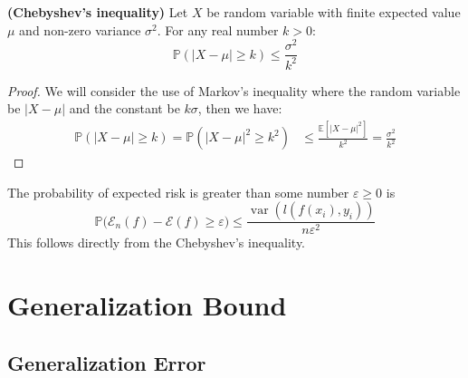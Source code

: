 \begin{theorem}{\textbf{(Chebyshev's inequality)}}
    Let $X$ be random variable with finite expected value $\mu$ and non-zero variance $\sigma^2$. For any real number $k>0$:
    \begin{equation*}
        \mathbb{P}(|X - \mu|\ge k) \le \frac{\sigma^2}{k^2} 
    \end{equation*}
\end{theorem}
\begin{proof}
    We will consider the use of Markov's inequality where the random variable be $|X-\mu|$ and the constant be $k\sigma$, then we have:
    \begin{equation*}
    \begin{aligned}
        \mathbb{P}(|X-\mu|\ge k) = \mathbb{P}(|X-\mu|^2\ge k^2) &\le \frac{\mathbb{E}[|X-\mu|^2]}{k^2} = \frac{\sigma^2}{k^2} 
    \end{aligned}
    \end{equation*}
\end{proof}

\begin{proposition}
    The probability of expected risk is greater than some number $\varepsilon\ge0$ is 
    \begin{equation*}
        \mathbb{P}\Big( \mathcal{E}_n(f) - \mathcal{E}(f) \ge\varepsilon \Big) \le \frac{\operatorname{var}(l(f(x_i), y_i))}{n\varepsilon^2}
    \end{equation*}
    This follows directly from the Chebyshev's inequality.
\end{proposition}

\section{Generalization Bound}

\subsection{Generalization Error}

